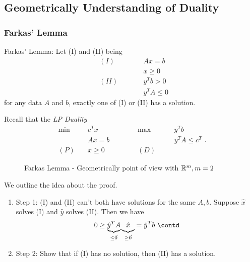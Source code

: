 \subsection{Geometrically Understanding of Duality}
\subsubsection{Farkas' Lemma}
\begin{lemma}
	\label{Farkas Lemma}
	Farkas' Lemma: Let (I) and (II) being
	\[
		\begin{alignedat}{3}
			& (I) \qquad&& Ax = b       \\
			&      && x\geq 0      \\
			& (II) \qquad&& y^{T}b > 0 \\
			&      && y^{T}A\leq 0
		\end{alignedat}
	\]
	for any data \(A\) and \(b\), exactly one of (I) or (II) has a solution.
\end{lemma}
\begin{note}
	Recall that the \emph{LP Duality}
	\[
		\begin{alignedat}{5}
			\min~&c^{T}x\qquad\qquad&&\max ~&&y^{T}b\\
			&Ax = b 				&&		&&y^{T}A\leq c^{T}\\
			(P)\quad	&x\geq  0 	&&(D)\quad&&
		\end{alignedat}.
	\]
\end{note}

\begin{figure}[H]
	\centering
	\caption{Farkas Lemma - Geometrically point of view with \(\mathbb{\MakeUppercase{R}}^m, m = 2\) }
	\label{fig:Farkas-lemma}
\end{figure}

\begin{intuition}
	We outline the idea about the proof.
	\begin{enumerate}
		\item Step 1: (I) and (II) can't both have solutions for the same \(A, b\).
		      Suppose \(\hat{x}\) solves (I) and \(\hat{y}\) solves (II). Then we have
		      \[
			      0\geq  \underbrace{\hat{y}^{T} A}_{\leq \vec{0}} \underbrace{\vphantom{\hat{y}^{T}A} \hat{x}}_{\geq \vec{0}} = \hat{y}^{T} b\ \contd
		      \]
		\item Step 2: Show that if (I) has no solution, then (II) has a solution.
	\end{enumerate}
\end{intuition}